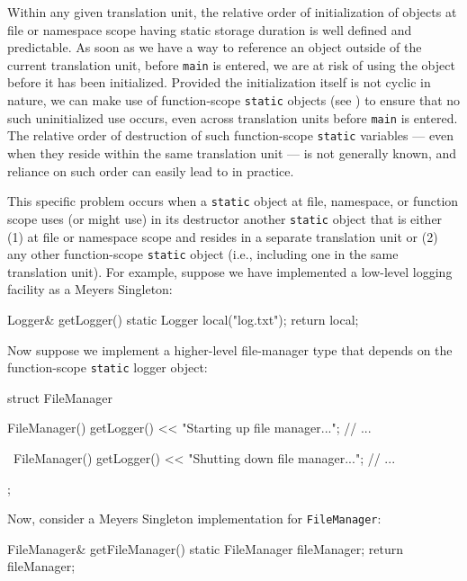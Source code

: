 Within any given translation unit, the relative order of initialization
of objects at file or namespace scope having static storage duration is
well defined and predictable. As soon as we have a way to reference an
object outside of the current translation unit, before \lstinline!main! is
entered, we are at risk of using the object before it has been
initialized. Provided the initialization itself is not cyclic in nature,
we can make use of function-scope \lstinline!static! objects (see ) to
ensure that no such uninitialized use occurs, even across translation
units before \lstinline!main! is entered. The relative order of destruction
of such function-scope \lstinline!static! variables --- even when they
reside within the same translation unit --- is not generally known, and
reliance on such order can easily lead to  in
practice.

This specific problem occurs when a \lstinline!static! object at file,
namespace, or function scope uses (or might use) in its destructor
another \lstinline!static! object that is either (1) at file or namespace
scope and resides in a separate translation unit or (2) any other
function-scope \lstinline!static! object (i.e., including one in the same
translation unit). For example, suppose we have implemented a low-level
logging facility as a Meyers Singleton:

\begin{emcppslisting}[emcppsbatch=e15]
Logger& getLogger()
{
    static Logger local("log.txt");
    return local;
}
\end{emcppslisting}

\noindent Now suppose we implement a higher-level file-manager type that depends
on the function-scope \lstinline!static! logger object:

\begin{emcppslisting}[emcppsbatch=e15]
struct FileManager
{
    FileManager()
    {
         getLogger() << "Starting up file manager...";
         // ...
    }

    ~FileManager()
    {
        getLogger() << "Shutting down file manager...";
        // ...
    }
};
\end{emcppslisting}

\noindent Now, consider a Meyers Singleton implementation for
\lstinline!FileManager!:

\begin{emcppslisting}[emcppsbatch=e15]
FileManager& getFileManager()
{
    static FileManager fileManager;
    return fileManager;
}
\end{emcppslisting}


